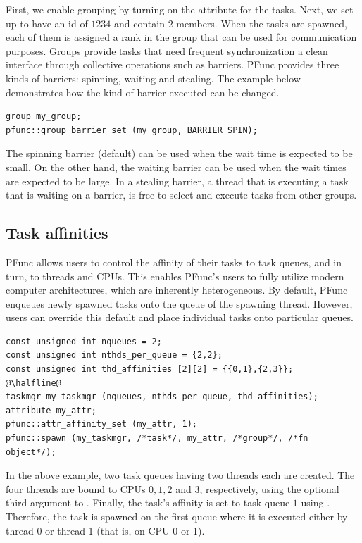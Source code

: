 \documentclass{sig-alternate}
\begin{document}
First, we enable grouping by turning on the  attribute for the
tasks. Next, we set up  to have an id of $1234$ and contain $2$
members. When the tasks are spawned, each of them is assigned a rank in the
group that can be used for communication purposes. Groups provide tasks that
need frequent synchronization a clean interface through collective operations
such as barriers.  PFunc provides three kinds of barriers: spinning, waiting
and stealing. The example below demonstrates how the kind of barrier executed
can be changed.

\begin{lstlisting}
group my_group;
pfunc::group_barrier_set (my_group, BARRIER_SPIN);
\end{lstlisting}

The spinning barrier (default) can be used when the wait time is expected to be
small. On the other hand, the waiting barrier can be used when the wait times
are expected to be large. In a stealing barrier, a thread that is executing a
task that is waiting on a barrier, is free to select and execute tasks from
other groups. 

\subsection{Task affinities}
\label{sec:affinities}
PFunc allows users to control the affinity of their tasks to task queues, and
in turn, to threads and CPUs.  This enables PFunc's users to fully utilize
modern computer architectures, which are inherently heterogeneous.  By
default, PFunc enqueues newly spawned tasks onto the queue of the spawning
thread. However, users can override this default and place individual tasks
onto particular queues.  

\begin{lstlisting}
const unsigned int nqueues = 2;
const unsigned int nthds_per_queue = {2,2};
const unsigned int thd_affinities [2][2] = {{0,1},{2,3}};
@\halfline@
taskmgr my_taskmgr (nqueues, nthds_per_queue, thd_affinities);
attribute my_attr;
pfunc::attr_affinity_set (my_attr, 1);
pfunc::spawn (my_taskmgr, /*task*/, my_attr, /*group*/, /*fn object*/);
\end{lstlisting}

In the above example, two task queues having two threads each are created. The
four threads are bound to CPUs $0, 1, 2$ and $3$, respectively, using the
optional third argument to . Finally, the task's affinity is
set to task queue $1$ using . Therefore, the task is spawned
on the first queue where it is executed either by thread 0 or thread 1 (that
is, on CPU 0 or 1).
\end{document}
